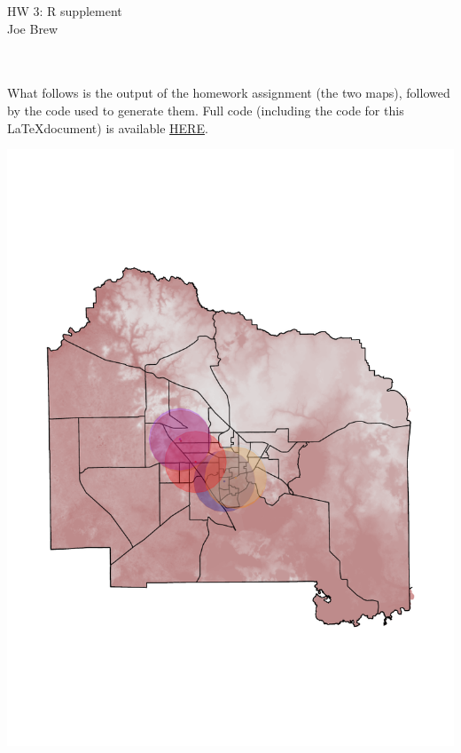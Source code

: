 \documentclass{article}
\begin{document}



\begin{center}
\huge{HW 3: R supplement}\\
\large{Joe Brew}
\end{center}

\\

\noindent  \\

\noindent What follows is the output of the homework assignment (the two maps), followed by the code used to generate them.  Full code (including the code for this \LaTeX document) is available \href{https://github.com/joebrew/uf/tree/master/phc6194/hw3}{HERE}.

\begin{center}
\includegraphics{hw3_R_joe_brew-002}
\end{center}
\end{document}
